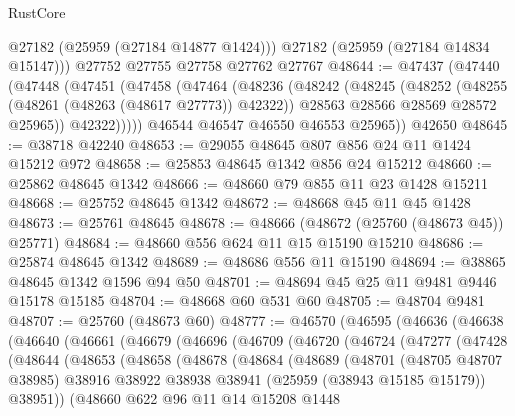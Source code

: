 \begin{lexlean}{RustCore}
\begin{coremodule}
        @27182
        (@25959 (@27184 @14877 @1424)))
      @27182
      (@25959 (@27184 @14834 @15147)))
    @27752
    @27755
    @27758
    @27762
    @27767
@48644 := @47437
    (@47440
      (@47448
        (@47451
          (@47458
            (@47464
              (@48236
                (@48242
                  (@48245
                    (@48252
                      (@48255 (@48261 (@48263 (@48617 @27773)) @42322))
                      @28563
                      @28566
                      @28569
                      @28572
                      @25965))
                  @42322)))))
        @46544
        @46547
        @46550
        @46553
        @25965))
    @42650
@48645 := @38718 @42240
@48653 := @29055 @48645 @807 @856 @24 @11 @1424 @15212 @972
@48658 := @25853 @48645 @1342 @856 @24 @15212
@48660 := @25862 @48645 @1342
@48666 := @48660 @79 @855 @11 @23 @1428 @15211
@48668 := @25752 @48645 @1342
@48672 := @48668 @45 @11 @45 @1428
@48673 := @25761 @48645
@48678 := @48666 (@48672 (@25760 (@48673 @45)) @25771)
@48684 := @48660 @556 @624 @11 @15 @15190 @15210
@48686 := @25874 @48645 @1342
@48689 := @48686 @556 @11 @15190
@48694 := @38865 @48645 @1342 @1596 @94 @50
@48701 := @48694 @45 @25 @11 @9481 @9446 @15178 @15185
@48704 := @48668 @60 @531 @60
@48705 := @48704 @9481
@48707 := @25760 (@48673 @60)
@48777 := @46570
    (@46595
      (@46636
        (@46638
          (@46640
            (@46661
              (@46679
                (@46696
                  (@46709
                    (@46720
                      (@46724
                        (@47277
                          (@47428
                            (@48644
                              (@48653
                                (@48658
                                  (@48678
                                    (@48684
                                      (@48689
                                        (@48701
                                          (@48705 @48707 @38985)
                                          @38916
                                          @38922
                                          @38938
                                          @38941
                                          (@25959 (@38943 @15185 @15179))
                                          @38951))
                                      (@48660
                                        @622
                                        @96
                                        @11
                                        @14
                                        @15208
                                        @1448

\end{coremodule}
\end{lexlean}
